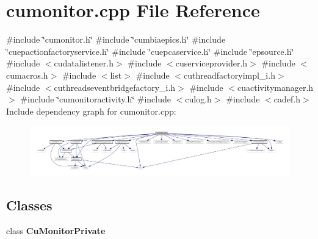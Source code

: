 \section{cumonitor.\+cpp File Reference}
\label{cumonitor_8cpp}
{\ttfamily \#include \char`\"{}cumonitor.\+h\char`\"{}}\newline
{\ttfamily \#include \char`\"{}cumbiaepics.\+h\char`\"{}}\newline
{\ttfamily \#include \char`\"{}cuepactionfactoryservice.\+h\char`\"{}}\newline
{\ttfamily \#include \char`\"{}cuepcaservice.\+h\char`\"{}}\newline
{\ttfamily \#include \char`\"{}epsource.\+h\char`\"{}}\newline
{\ttfamily \#include $<$cudatalistener.\+h$>$}\newline
{\ttfamily \#include $<$cuserviceprovider.\+h$>$}\newline
{\ttfamily \#include $<$cumacros.\+h$>$}\newline
{\ttfamily \#include $<$list$>$}\newline
{\ttfamily \#include $<$cuthreadfactoryimpl\+\_\+i.\+h$>$}\newline
{\ttfamily \#include $<$cuthreadseventbridgefactory\+\_\+i.\+h$>$}\newline
{\ttfamily \#include $<$cuactivitymanager.\+h$>$}\newline
{\ttfamily \#include \char`\"{}cumonitoractivity.\+h\char`\"{}}\newline
{\ttfamily \#include $<$culog.\+h$>$}\newline
{\ttfamily \#include $<$cadef.\+h$>$}\newline
Include dependency graph for cumonitor.\+cpp\+:\nopagebreak
\begin{figure}[H]
\begin{center}
\leavevmode
\includegraphics[width=350pt]{cumonitor_8cpp__incl}
\end{center}
\end{figure}
\subsection*{Classes}
\begin{DoxyCompactItemize}
\item 
class \textbf{ Cu\+Monitor\+Private}
\end{DoxyCompactItemize}
